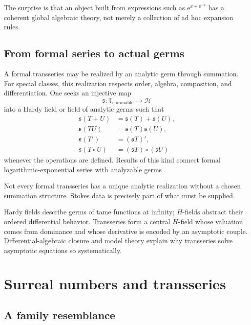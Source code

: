 \documentclass[11pt,oneside]{book}
\theoremstyle{definition}
\theoremstyle{remark}
\newcommand{\T}{\mathbb{T}}
\newcommand{\e}{\mathrm{e}}
\newcommand{\compose}{\mathbin{\circ}}
\begin{document}
The surprise is that an object built from expressions such as
$\e^{x+\e^{-x}}$ has a coherent global algebraic theory, not merely a collection
of ad hoc expansion rules.

\section{From formal series to actual germs}

A formal transseries may be realized by an analytic germ through summation. For
special classes, this realization respects order, algebra, composition, and
differentiation. One seeks an injective map
\[
  \mathfrak s:\T_{\mathrm{summable}}\longrightarrow\mathcal H
\]
into a Hardy field or field of analytic germs such that
\begin{align*}
  \mathfrak s(T+U)&=\mathfrak s(T)+\mathfrak s(U),\\
  \mathfrak s(TU)&=\mathfrak s(T)\mathfrak s(U),\\
  \mathfrak s(T')&=(\mathfrak sT)',\\
  \mathfrak s(T\compose U)&=(\mathfrak sT)\compose(\mathfrak sU)
\end{align*}
whenever the operations are defined. Results of this kind connect formal
logarithmic-exponential series with analyzable germs
\cite{vanDenDriesMacintyreMarker1997,vanDenDriesMacintyreMarker2001,CostinBook}.

Not every formal transseries has a unique analytic realization without a chosen
summation structure. Stokes data is precisely part of what must be supplied.

\begin{summarybox}
Hardy fields describe germs of tame functions at infinity; $H$-fields abstract
their ordered differential behavior. Transseries form a central $H$-field whose
valuation comes from dominance and whose derivative is encoded by an asymptotic
couple. Differential-algebraic closure and model theory explain why transseries
solve asymptotic equations so systematically.
\end{summarybox}


\chapter{Surreal numbers and transseries}
\label{ch:surreals}

\section{A family resemblance}
\end{document}
